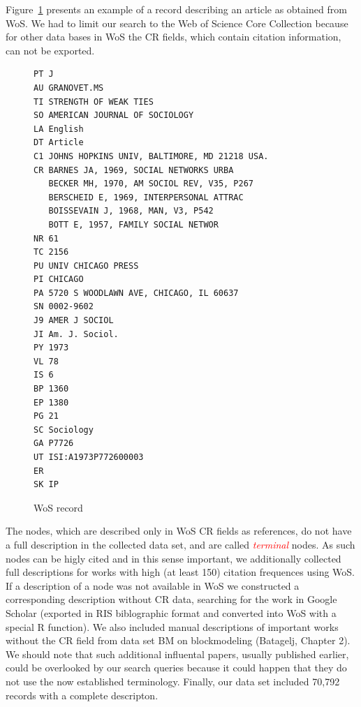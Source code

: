 \documentclass[11pt]{article} %
\newcommand{\keyw}[1]{\textcolor{red}{\emph{#1}}}
\begin{document}
Figure~\ref{wos} presents an example of a record describing an article as obtained from WoS. We had to limit our search to the Web of Science Core Collection because for other data bases in WoS the CR fields, which contain citation information, can not be exported.  \medskip

\begin{figure}
\renewcommand{\baselinestretch}{0.8}
\scriptsize
\begin{verbatim}
PT J
AU GRANOVET.MS
TI STRENGTH OF WEAK TIES
SO AMERICAN JOURNAL OF SOCIOLOGY
LA English
DT Article
C1 JOHNS HOPKINS UNIV, BALTIMORE, MD 21218 USA.
CR BARNES JA, 1969, SOCIAL NETWORKS URBA
   BECKER MH, 1970, AM SOCIOL REV, V35, P267
   BERSCHEID E, 1969, INTERPERSONAL ATTRAC
   BOISSEVAIN J, 1968, MAN, V3, P542
   BOTT E, 1957, FAMILY SOCIAL NETWOR
NR 61
TC 2156
PU UNIV CHICAGO PRESS
PI CHICAGO
PA 5720 S WOODLAWN AVE, CHICAGO, IL 60637
SN 0002-9602
J9 AMER J SOCIOL
JI Am. J. Sociol.
PY 1973
VL 78
IS 6
BP 1360
EP 1380
PG 21
SC Sociology
GA P7726
UT ISI:A1973P772600003
ER
SK IP
\end{verbatim}
\caption{WoS record}\label{wos}
\end{figure}

The nodes, which are described only in WoS CR fields as references, do not have a full description in the collected data set, and are called \keyw{terminal} nodes. As such nodes can be higly cited and in this sense important, we additionally collected full descriptions for works with high (at least 150) citation frequences using WoS. If a description of a node was not available in WoS we constructed a corresponding description without CR data, searching for the work in Google Scholar (exported in RIS biblographic format and converted into WoS with a special R function). We also included manual descriptions of important works without the CR field from data set BM on blockmodeling (Batagelj, Chapter 2). We should note that such additional influental papers, usually published earlier, could be overlooked by our search queries because it could happen that they do not use the now established terminology. Finally, our data set included 70,792 records with a complete descripton.  \medskip
\end{document}
